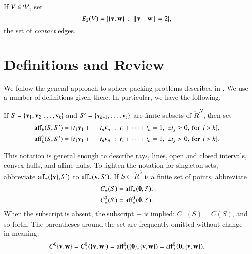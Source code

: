 \documentclass{llncs}
\def\op#1{{\hbox{#1}}}
\begin{document}
If $V\in {\mathcal V}$, set 
\[
E_2(V)=\{\{\v,\w\} \mid \norm{\v}{\w}=2\},
\]
the set of {\it contact} edges.




\section{Definitions and Review}

We follow the general approach to sphere packing problems described in
\cite{DSP}.  We use a number of definitions given there.  In
particular, we have the following.

\begin{definition}[affine]\label{def:aff} 
  If $S = \{{\mathbf v}_1,{\mathbf v}_2,\ldots,{\mathbf v}_k\}$ and $S'=\{{\mathbf v}_{k+1},\ldots,{\mathbf v}_n\}$
  are finite subsets of $\ring{R}^N$, then set
	\begin{align*}
\op{aff}_{\pm} (S,S') &= \{t_1 \v_1 +\cdots t_n \v_n \mid
	t_1 +\cdots+t_n = 1,~ \pm t_j \ge 0, \text{ for } j>k\},\\
\op{aff}^0_{\pm} (S,S') &= \{t_1 \v_1 +\cdots t_n \v_n \mid
	t_1 +\cdots+t_n = 1,~ \pm t_j > 0, \text{ for } j>k\}.
		\end{align*}
\indy{Notation}{aff2@$\op{aff}_{\pm}$, $\op{aff}^0_{\pm}$}%
%
%
\end{definition}


This notation is general enough to describe rays, lines, open and closed intervals,
convex hulls, and affine hulls.
To lighten the notation for singleton sets, abbreviate
$\op{aff}_\pm(\{\v\},S')$ to $\op{aff}_\pm(\v,S')$.
If $S\subset\ring{R}^3$ is a finite set of points,
abbreviate
\begin{align*}
C_\pm(S) &= \op{aff}_\pm(\orz,S),\\
C^0_\pm(S) &= \op{aff}^0_\pm(\orz,S).\\
\end{align*}
When the subscript is absent, the subscript $+$ is implied: $C_+(S)
= C(S)$, and so forth.  The parentheses around the set are frequently
omitted without change in meaning:
\[ C^0\{\v,\w\}=C^0_+(\{\v,\w\}) =
\op{aff}^0_+(\{\orz\},\{\v,\w\}) = \op{aff}_+^0(\orz,\{\v,\w\}).\] 
\end{document}
